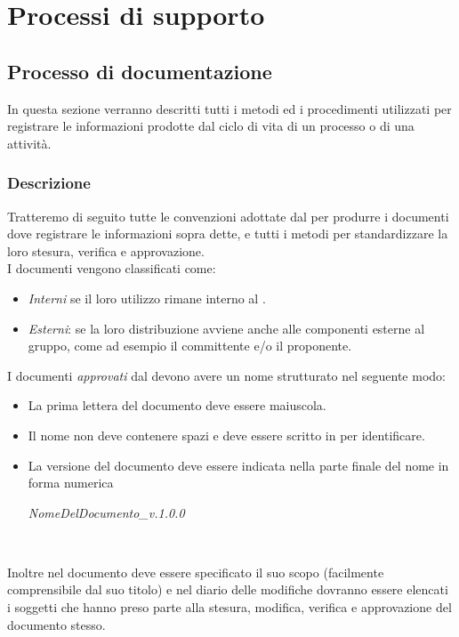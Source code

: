 \section{Processi di supporto}
\subsection{Processo di documentazione}
In questa sezione verranno descritti tutti i metodi ed i procedimenti utilizzati per registrare le informazioni prodotte dal ciclo di vita di un processo o di una attività.

\subsubsection{Descrizione}
Tratteremo di seguito tutte le convenzioni adottate dal  per produrre i documenti dove registrare le informazioni sopra dette, e tutti i metodi per standardizzare la loro  stesura, verifica e approvazione. \\
I documenti vengono classificati come:
\begin{itemize}
  \item \textit{Interni} se il loro utilizzo rimane interno al .
  \item \textit{Esterni}: se la loro distribuzione avviene anche alle componenti esterne al gruppo, come ad esempio il committente e/o il proponente.
\end{itemize}

I documenti \textit{approvati} dal \textit{\Pm} devono avere un nome strutturato nel seguente modo:
\begin{itemize}
  \item La prima lettera del documento deve essere maiuscola.
  \item Il nome non deve contenere spazi e deve essere scritto in  per identificare. 
  \item La versione del documento deve essere indicata nella parte finale del nome in forma numerica
  \begin{center}
  \textit{NomeDelDocumento\_v.1.0.0}
  \end{center}\
\end{itemize}
Inoltre nel documento deve essere specificato il suo scopo (facilmente comprensibile dal suo titolo) e  nel diario delle modifiche dovranno essere elencati i soggetti che hanno preso parte alla stesura, modifica, verifica e approvazione del documento stesso.

